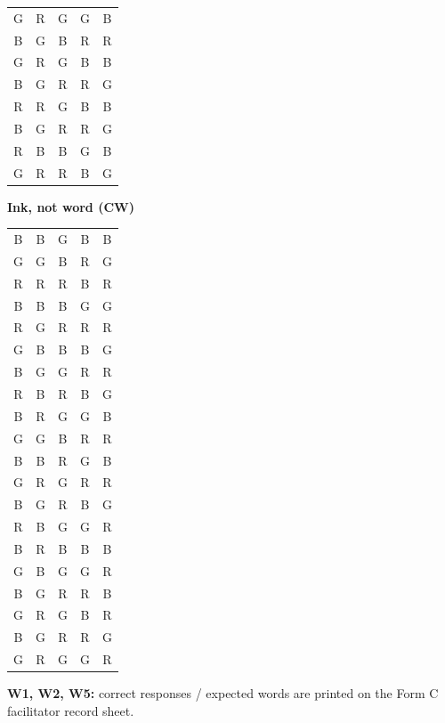 \documentclass[10pt,a4paper]{article}
\begin{document}
\begin{minipage}[t]{0.3\linewidth}
\begin{tabular}{ccccc}
G & R & G & G & B\\
B & G & B & R & R\\
G & R & G & B & B\\
B & G & R & R & G\\
R & R & G & B & B\\
B & G & R & R & G\\
R & B & B & G & B\\
G & R & R & B & G\\\end{tabular}\end{minipage}\hfill\begin{minipage}[t]{0.3\linewidth}\centering\textbf{Ink, not word (CW)}\\[2pt]\ttfamily\footnotesize\begin{tabular}{ccccc}B & B & G & B & B\\
G & G & B & R & G\\
R & R & R & B & R\\
B & B & B & G & G\\
R & G & R & R & R\\
G & B & B & B & G\\
B & G & G & R & R\\
R & B & R & B & G\\
B & R & G & G & B\\
G & G & B & R & R\\
B & B & R & G & B\\
G & R & G & R & R\\
B & G & R & B & G\\
R & B & G & G & R\\
B & R & B & B & B\\
G & B & G & G & R\\
B & G & R & R & B\\
G & R & G & B & R\\
B & G & R & R & G\\
G & R & G & G & R\\\end{tabular}\end{minipage}\par\medskip
\textbf{W1, W2, W5:} correct responses / expected words are printed on the Form C facilitator record sheet.
\end{document}
